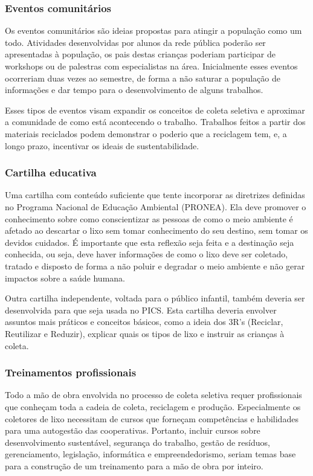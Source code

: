    \subsubsection{Eventos comunitários}

   Os eventos comunitários são ideias propostas para atingir a população como um todo. Atividades desenvolvidas por alunos da rede pública poderão ser apresentadas à população, os pais destas crianças poderiam participar de workshops ou de palestras com especialistas na área. Inicialmente esses eventos ocorreriam duas vezes ao semestre, de forma a não saturar a população de informações e dar tempo para o desenvolvimento de alguns trabalhos.

   Esses tipos de eventos visam expandir os conceitos de coleta seletiva e aproximar a comunidade de como está acontecendo o trabalho. Trabalhos feitos a partir dos materiais reciclados podem demonstrar o poderio que a reciclagem tem, e, a longo prazo, incentivar os ideais de sustentabilidade.

   \subsubsection{Cartilha educativa}

   Uma cartilha com conteúdo suficiente que tente incorporar as diretrizes definidas no Programa Nacional de Educação Ambiental (PRONEA). Ela deve promover o conhecimento sobre como conscientizar as pessoas de como o meio ambiente é afetado ao descartar o lixo sem tomar conhecimento do seu destino, sem tomar os devidos cuidados. É importante que esta reflexão seja feita e a destinação seja conhecida, ou seja, deve haver informações de como o lixo deve ser coletado, tratado e disposto de forma a não poluir e degradar o meio ambiente e não gerar impactos sobre a saúde humana.

   Outra cartilha independente, voltada para o público infantil, também deveria ser desenvolvida para que seja usada no PICS. Esta cartilha deveria envolver assuntos mais práticos e conceitos básicos, como a ideia dos 3R’s (Reciclar, Reutilizar e Reduzir), explicar quais os tipos de lixo e instruir as crianças à coleta.

   \subsubsection{Treinamentos profissionais}

   Todo a mão de obra envolvida no processo de coleta seletiva requer profissionais que conheçam toda a cadeia de coleta, reciclagem e produção. Especialmente os coletores de lixo necessitam de cursos que forneçam competências e habilidades para uma autogestão das cooperativas. Portanto, incluir cursos sobre desenvolvimento sustentável, segurança do trabalho, gestão de resíduos, gerenciamento, legislação, informática e empreendedorismo, seriam temas base para a construção de um treinamento para a mão de obra por inteiro.

